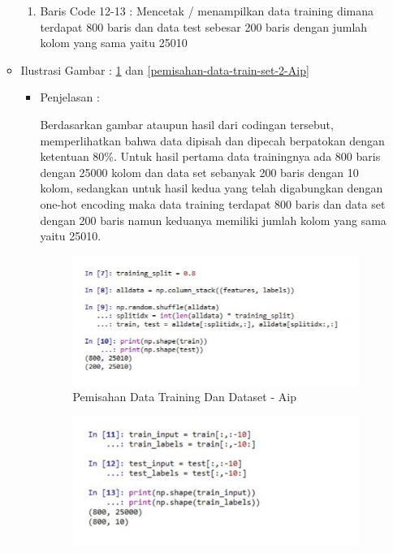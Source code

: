 \begin{enumerate}
\begin{itemize}
\begin{enumerate}
\item Baris Code 12-13 : Mencetak / menampilkan data training dimana terdapat 800 baris dan data test sebesar 200 baris dengan jumlah kolom yang sama yaitu 25010
\par
\end{enumerate}
\item  Ilustrasi Gambar : \ref{pemisahan-data-train-set-Aip} dan  \ref{pemisahan-data-train-set-2-Aip}
\begin{itemize}
\item Penjelasan : 
\par Berdasarkan gambar ataupun hasil dari codingan tersebut, memperlihatkan bahwa data dipisah dan dipecah berpatokan dengan ketentuan 80\%. Untuk hasil pertama data trainingnya ada 800 baris dengan 25000 kolom dan data set sebanyak 200 baris dengan 10 kolom, sedangkan untuk hasil kedua yang telah digabungkan dengan one-hot encoding maka data training terdapat 800 baris dan data set dengan 200 baris namun keduanya memiliki jumlah kolom yang sama yaitu 25010.
\par
\par
\begin{figure}[!hbtp]
\centering
\includegraphics[scale=0.2]{figures/AIP/datatrainset.PNG}
\caption{Pemisahan Data Training Dan Dataset - Aip}
\label{pemisahan-data-train-set-Aip}
\end{figure}
\par
\par
\begin{figure}[!hbtp]
\centering
\includegraphics[scale=0.2]{figures/AIP/datatrainset2.PNG}

\end{figure}
\end{itemize}
\end{itemize}
\end{enumerate}
